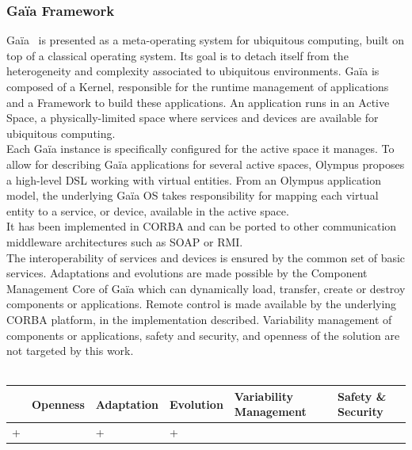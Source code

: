 \subsubsection{Ga\"ia Framework}
Ga\"ia~\cite{Roman:2002} is presented as a meta-operating system for ubiquitous computing, built on top of a classical operating system. Its goal is to detach itself from the heterogeneity and complexity associated to ubiquitous environments. Ga\"ia is composed of a Kernel, responsible for the runtime management of applications and a Framework to build these applications. An application runs in an Active Space, a physically-limited space where services and devices are available for ubiquitous computing.\\
Each Ga\"ia instance is specifically configured for the active space it manages. To allow for describing Ga\"ia applications for several active spaces, Olympus\cite{Ranganathan:2005} proposes a high-level DSL working with virtual entities. From an Olympus application model, the underlying Ga\"ia OS takes responsibility for mapping each virtual entity to a service, or device, available in the active space.\\
It has been implemented in CORBA and can be ported to other communication middleware architectures such as SOAP or RMI.\\

The interoperability of services and devices is ensured by the common set of basic services. Adaptations and evolutions are made possible by the Component Management Core of Ga\"ia which can dynamically load, transfer, create or destroy components or applications. Remote control is made available by the underlying CORBA platform, in the implementation described. Variability management of components or applications, safety and security, and openness of the solution are not targeted by this work.\\
\\
\begin{tabular}{ >{\centering}m{}| >{\centering}m{} >{\centering}m{}| >{\centering}m{} >{\centering}m{}| >{\centering\arraybackslash}m{}}
{\tiny Interoperability} & {\tiny Openness} & {\tiny Adaptation} & {\tiny Evolution} & {\tiny Variability Management} & {\tiny Safety \& Security}\\
 \hline
 + &  & + & + &  &  \\ 
  \hline
\end{tabular}\\


